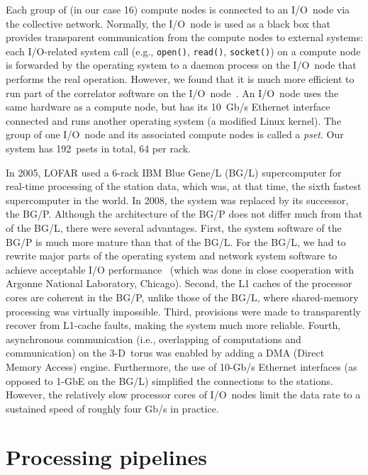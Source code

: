 Each group of (in our case 16) compute nodes is connected to an I/O~node via
the collective network.
Normally, the I/O~node is used as a black box that provides transparent
communication from the compute nodes to external systems: each I/O-related
system call (e.g., \texttt{open()}, \texttt{read()}, \texttt{socket()}) on a
compute node is forwarded by the operating system to a daemon process on
the I/O~node that performs the real operation.
However, we found that it is much more efficient to run part of the correlator
software on the I/O~node~\cite{Iskra:08}.
An I/O~node uses the same hardware as a compute node, but has its
10~Gb/s Ethernet interface connected and runs another operating system
(a modified Linux kernel).
The group of one I/O~node and its associated compute nodes is called a
\emph{pset}.
Our system has 192~psets in total, 64 per rack.

In 2005, LOFAR used a 6-rack IBM Blue Gene/L (BG/L) supercomputer for real-time
processing of the station data, which was, at that time, the sixth fastest
supercomputer in the world.
In 2008, the system was replaced by its successor, the BG/P.
Although the architecture of the BG/P does not differ much from that
of the BG/L, there were several advantages.
First, the system software of the BG/P is much more mature than that of the
BG/L.
For the BG/L, we had to rewrite major parts of the operating system and network
system software to achieve acceptable I/O
performance~\cite{Iskra:08,Boonstoppel:08} (which was done in close cooperation
with Argonne National Laboratory, Chicago).
Second, the L1 caches of the processor cores are coherent in the BG/P, unlike
those of the BG/L, where shared-memory processing was virtually impossible.
Third, provisions were made to transparently recover from L1-cache faults,
making the system much more reliable.
Fourth, asynchronous communication (i.e., overlapping of computations and
communication) on the 3-D~torus was enabled by adding a DMA (Direct Memory
Access) engine.
Furthermore, the use of 10-Gb/s Ethernet interfaces (as opposed to 1-GbE on
the BG/L) simplified the connections to the stations.
However, the relatively slow processor cores of I/O~nodes limit the data rate
to a sustained speed of roughly four Gb/s in practice.



\section{Processing pipelines}

